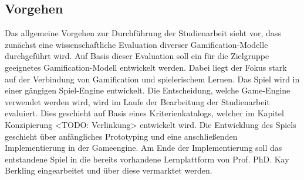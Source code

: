 \subsection{Vorgehen}
	Das allgemeine Vorgehen zur Durchführung der Studienarbeit sieht vor, dass zunächst eine wissenschaftliche Evaluation diverser Gamification-Modelle durchgeführt wird. Auf Basis dieser Evaluation soll ein für die Zielgruppe geeignetes Gamification-Modell entwickelt werden. Dabei liegt der Fokus stark auf der Verbindung von Gamification und spielerischem Lernen.
	Das Spiel wird in einer gängigen Spiel-Engine entwickelt. Die Entscheidung, welche Game-Engine verwendet werden wird, wird im Laufe der Bearbeitung der Studienarbeit evaluiert. Dies geschieht auf Basis eines Kriterienkatalogs, welcher im Kapitel Konzipierung <TODO: Verlinkung> entwickelt wird.
	Die Entwicklung des Spiels geschieht über anfängliches Prototyping und eine anschließenden Implementierung in der Gameengine. Am Ende der Implementierung soll das entstandene Spiel in die bereits vorhandene Lernplattform von Prof. PhD. Kay Berkling eingearbeitet und über diese vermarktet werden.
